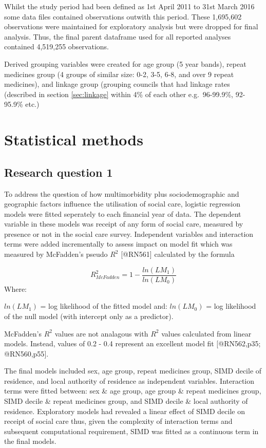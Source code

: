 \documentclass[]{article}
\begin{document}
Whilst the study period had been defined as 1st April 2011 to 31st March
2016 some data files contained observations outwith this period. These
1,695,602 observations were maintained for exploratory analysis but were
dropped for final analysis. Thus, the final parent dataframe used for
all reported analyses contained 4,519,255 observations.

Derived grouping variables were created for age group (5 year bands),
repeat medicines group (4 groups of similar size: 0-2, 3-5, 6-8, and
over 9 repeat medicines), and linkage group (grouping councils that had
linkage rates (described in section \ref{sec:linkage} within 4\% of each
other e.g.~96-99.9\%, 92-95.9\% etc.)

\FloatBarrier

\section{Statistical methods}\label{sec:methods-stats}

\subsection{Research question 1}\label{stats-rq1}

To address the question of how multimorbidity plus sociodemographic and
geographic factors influence the utilisation of social care, logistic
regression models were fitted seperately to each financial year of data.
The dependent variable in these models was receipt of any form of social
care, measured by presence or not in the social care survey. Independent
variables and interaction terms were added incrementally to assess
impact on model fit which was measured by McFadden's pseudo \(R^2\)
{[}@RN561{]} calculated by the formula

\[R^{2}_{McFadden} = 1 - \frac {ln(LM_{1})}{ln(LM_{0})} \] Where:

\(ln(LM_{1})\) = log likelihood of the fitted model and:\newline
\(ln(LM_{0})\) = log likelihood of the null model (with intercept only
as a predictor).

McFadden's \(R^2\) values are not analagous with \(R^2\) values
calculated from linear models. Instead, values of 0.2 - 0.4 represent an
excellent model fit {[}@RN562,p35; @RN560,p55{]}.

The final models included sex, age group, repeat medicines group, SIMD
decile of residence, and local authority of residence as independent
variables. Interaction terms were fitted between: sex \& age group, age
group \& repeat medicines group, SIMD decile \& repeat medicines group,
and SIMD decile \& local authority of residence. Exploratory models had
revealed a linear effect of SIMD decile on receipt of social care thus,
given the complexity of interaction terms and subsequent computational
requirement, SIMD was fitted as a continuous term in the final models.
\end{document}
